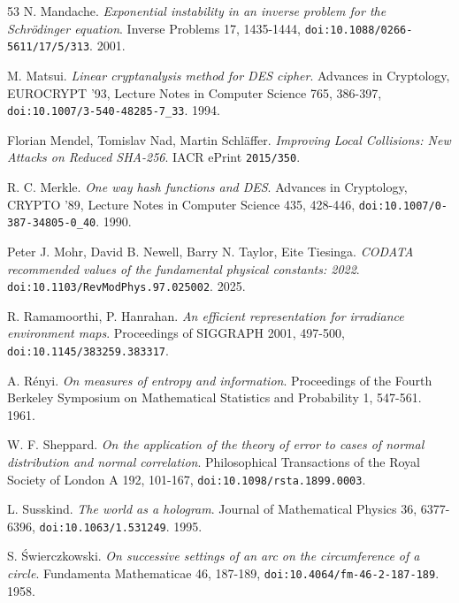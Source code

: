 \begin{thebibliography}{53}
N. Mandache. \emph{Exponential instability in an inverse problem for the Schrödinger equation}. Inverse Problems 17, 1435-1444, \texttt{doi:10.1088/\allowbreak{}0266-5611/\allowbreak{}17/\allowbreak{}5/\allowbreak{}313}. 2001.

M. Matsui. \emph{Linear cryptanalysis method for DES cipher}. Advances in Cryptology, EUROCRYPT '93, Lecture Notes in Computer Science 765, 386-397, \texttt{doi:10.1007/\allowbreak{}3-540-48285-7\_\allowbreak{}33}. 1994.

Florian Mendel, Tomislav Nad, Martin Schläffer. \emph{Improving Local Collisions: New Attacks on Reduced SHA-256}. IACR ePrint \texttt{2015/\allowbreak{}350}.

R. C. Merkle. \emph{One way hash functions and DES}. Advances in Cryptology, CRYPTO '89, Lecture Notes in Computer Science 435, 428-446, \texttt{doi:10.1007/\allowbreak{}0-387-34805-0\_\allowbreak{}40}. 1990.

Peter J. Mohr, David B. Newell, Barry N. Taylor, Eite Tiesinga. \emph{CODATA recommended values of the fundamental physical constants: 2022}. \texttt{doi:10.1103/\allowbreak{}RevModPhys.97.025002}. 2025.

R. Ramamoorthi, P. Hanrahan. \emph{An efficient representation for irradiance environment maps}. Proceedings of SIGGRAPH 2001, 497-500, \texttt{doi:10.1145/\allowbreak{}383259.383317}.

A. Rényi. \emph{On measures of entropy and information}. Proceedings of the Fourth Berkeley Symposium on Mathematical Statistics and Probability 1, 547-561. 1961.

W. F. Sheppard. \emph{On the application of the theory of error to cases of normal distribution and normal correlation}. Philosophical Transactions of the Royal Society of London A 192, 101-167, \texttt{doi:10.1098/\allowbreak{}rsta.1899.0003}.

L. Susskind. \emph{The world as a hologram}. Journal of Mathematical Physics 36, 6377-6396, \texttt{doi:10.1063/\allowbreak{}1.531249}. 1995.

S. Świerczkowski. \emph{On successive settings of an arc on the circumference of a circle}. Fundamenta Mathematicae 46, 187-189, \texttt{doi:10.4064/\allowbreak{}fm-46-2-187-189}. 1958.


\end{thebibliography}
